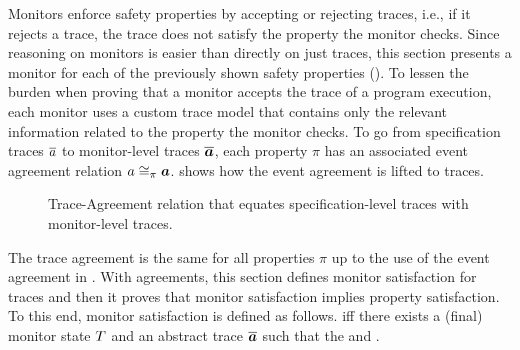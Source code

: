 \documentclass[utf8,acmsmall,review,screen,dvipsnames,anonymous]{acmart}
\begin{document}
Monitors enforce safety properties by accepting or rejecting traces, i.e., if it rejects a trace, the trace does not satisfy the property the monitor checks.
Since reasoning on monitors is easier than directly on just traces, this section presents a monitor for each of the previously shown safety properties ().
To lessen the burden when proving that a monitor accepts the trace of a program execution, each monitor uses a custom trace model that contains only the relevant information related to the property the monitor checks.
To go from specification traces $\trace$ to monitor-level traces $\abstrace$, each property $\pi$ has an associated event agreement relation $\traceagree[]{\pi}{\event}{\absevent}$.
 shows how the event agreement is lifted to traces.
\begin{figure}[!ht]
  \caption{Trace-Agreement relation that equates specification-level traces with monitor-level traces.}\label{fig:stuttereq}
\end{figure}
The trace agreement is the same for all properties $\pi$ up to the use of the event agreement in .
With agreements, this section defines monitor satisfaction for traces and then it proves that monitor satisfaction implies property satisfaction.
To this end, monitor satisfaction is defined as follows.
 iff there exists a (final) monitor state $\monitor$ and an abstract trace $\abstrace$ such that the  and .
\end{document}
